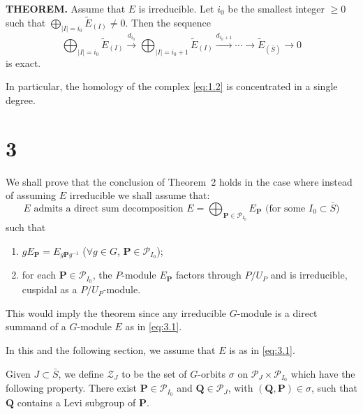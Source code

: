 \documentclass[10pt,a4paper]{article}
\theoremstyle{plain}
\theoremstyle{definition}
\theoremstyle{remark}
\newcommand{\cP}{\mathcal{P}}
\newcommand{\cZ}{\mathcal{Z}}
\newcommand{\bP}{\mathbf{P}}
\newcommand{\bQ}{\mathbf{Q}}
\begin{document}
\medskip\noindent\textbf{THEOREM.}\quad
Assume that $E$ is irreducible. Let $i_0$ be the smallest integer $\geq 0$ such that $\bigoplus_{|I|=i_0} \tilde{E}_{(I)} \neq 0$. Then the sequence
\begin{equation}\tag{2.1}\label{eq:2.1}
\bigoplus_{|I|=i_0} \tilde{E}_{(I)} \xrightarrow{d_{i_0}} \bigoplus_{|I|=i_0+1} \tilde{E}_{(I)} \xrightarrow{d_{i_0+1}} \cdots \to \tilde{E}_{(\bar S)} \to 0
\end{equation}
is exact.

In particular, the homology of the complex \eqref{eq:1.2} is concentrated in a single degree.

\section*{3}

We shall prove that the conclusion of Theorem~2 holds in the case where instead of assuming $E$ irreducible we shall assume that:
\begin{equation}\tag{3.1}\label{eq:3.1}
\text{$E$ admits a direct sum decomposition $E = \bigoplus_{\bP \in \cP_{I_0}} E_{\bP}$ (for some $I_0 \subset \bar S$)}
\end{equation}
such that

\newpage
\begin{enumerate}[label=(\alph*)]
\item $gE_{\bP} = E_{g\bP g^{-1}}$ ($\forall g \in G$, $\bP \in \cP_{I_0}$);
\item for each $\bP \in \cP_{I_0}$, the $P$-module $E_{\bP}$ factors through $P/U_P$ and is irreducible, cuspidal as a $P/U_P$-module.
\end{enumerate}
This would imply the theorem since any irreducible $G$-module is a direct summand of a $G$-module $E$ as in \eqref{eq:3.1}.

In this and the following section, we assume that $E$ is as in \eqref{eq:3.1}.

Given $J \subset \bar S$, we define $\cZ_J$ to be the set of $G$-orbits $\sigma$ on $\cP_J \times \cP_{I_0}$ which have the following property. There exist $\bP \in \cP_{I_0}$ and $\bQ \in \cP_J$, with $(\bQ,\bP) \in \sigma$, such that $\bQ$ contains a Levi subgroup of $\bP$.
\end{document}
